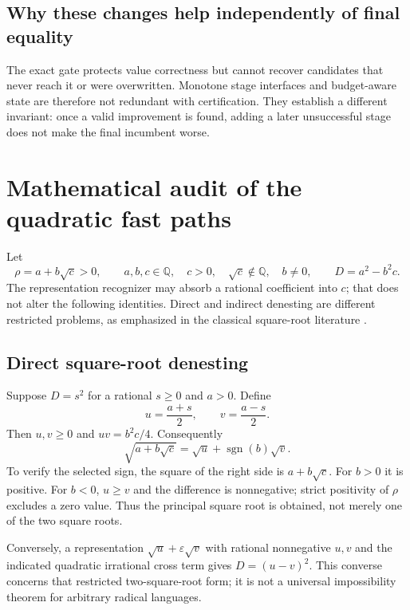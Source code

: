 \documentclass[11pt,letterpaper]{article}
\numberwithin{equation}{section}
\theoremstyle{definition}\newtheorem{definition}[theorem]{Definition}
\theoremstyle{remark}\newtheorem{remark}[theorem]{Remark}
\newcommand{\Q}{\mathbb Q}\newcommand{\C}{\mathbb C}\newcommand{\R}{\mathbb R}\newcommand{\Z}{\mathbb Z}
\newcommand{\sgn}{\operatorname{sgn}}
\begin{document}
\subsection{Why these changes help independently of final equality}
The exact gate protects value correctness but cannot recover candidates that never reach it or were overwritten. Monotone stage interfaces and budget-aware state are therefore not redundant with certification. They establish a different invariant: once a valid improvement is found, adding a later unsuccessful stage does not make the final incumbent worse.

\section{Mathematical audit of the quadratic fast paths}
\label{sec:quadratic}
Let
\begin{equation}
\rho=a+b\sqrt c>0,\qquad a,b,c\in\Q,\quad c>0,
\quad \sqrt c\notin\Q,\quad b\ne0,
\qquad D=a^2-b^2c.
\end{equation}
The representation recognizer may absorb a rational coefficient into $c$; that does not alter the following identities. Direct and indirect denesting are different restricted problems, as emphasized in the classical square-root literature \cite{bfht,gkioulekas,jeffrey}.

\subsection{Direct square-root denesting}
Suppose $D=s^2$ for a rational $s\ge0$ and $a>0$. Define
\begin{equation}
u=\frac{a+s}{2},\qquad v=\frac{a-s}{2}.
\end{equation}
Then $u,v\ge0$ and $uv=b^2c/4$. Consequently
\begin{equation}
\sqrt{a+b\sqrt c}=\sqrt u+\sgn(b)\sqrt v.
\label{eq:direct}
\end{equation}
To verify the selected sign, the square of the right side is $a+b\sqrt c$. For $b>0$ it is positive. For $b<0$, $u\ge v$ and the difference is nonnegative; strict positivity of $\rho$ excludes a zero value. Thus the principal square root is obtained, not merely one of the two square roots.

Conversely, a representation $\sqrt u+\varepsilon\sqrt v$ with rational nonnegative $u,v$ and the indicated quadratic irrational cross term gives $D=(u-v)^2$. This converse concerns that restricted two-square-root form; it is not a universal impossibility theorem for arbitrary radical languages.
\end{document}
